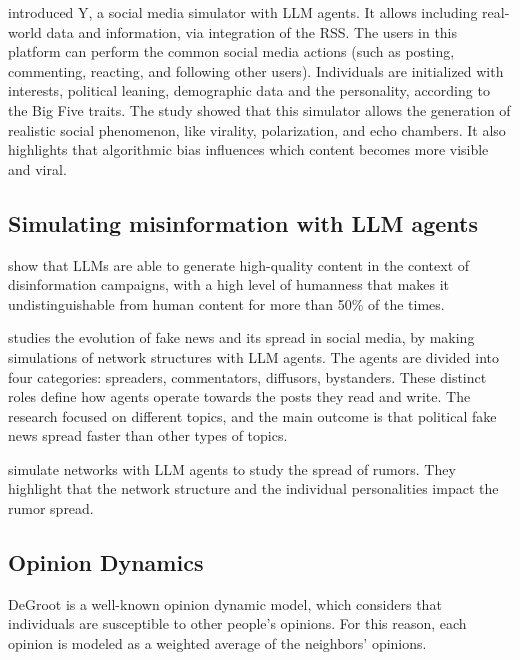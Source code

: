 \citet{rossetti2024ysocialllmpoweredsocial} introduced Y, a social media simulator with LLM agents.
It allows including real-world data and information, via integration of the RSS.
The users in this platform can perform the common social media actions (such as posting, commenting, reacting, and following other users).
Individuals are initialized with interests, political leaning, demographic data and the personality, according to the Big Five traits. \cite{McCrae1992}
The study showed that this simulator allows the generation of realistic social phenomenon, like virality, polarization, and echo chambers.
It also highlights that algorithmic bias influences which content becomes more visible and viral.




\subsection{Simulating misinformation with LLM agents}

\citet{williams2025hqdisinformation} show that LLMs are able to generate high-quality content in the context of disinformation campaigns, with a high level of humanness that makes it undistinguishable from human content for more than 50\% of the times.

\citet{liu2024tinyslipgiantleap} studies the evolution of fake news and its spread in social media, by making simulations of network structures with LLM agents.
The agents are divided into four categories: spreaders, commentators, diffusors, bystanders. These distinct roles define how agents operate towards the posts they read and write.
The research focused on different topics, and the main outcome is that political fake news spread faster than other types of topics.

\citet{hu2025simulatingrumorspreadingsocial} simulate networks with LLM agents to study the spread of rumors. They highlight that the network structure and the individual personalities impact the rumor spread.





\subsection{Opinion Dynamics}

DeGroot is a well-known opinion dynamic model, which considers that individuals are susceptible to other people's opinions. For this reason, each opinion is modeled as a weighted average of the neighbors' opinions.

